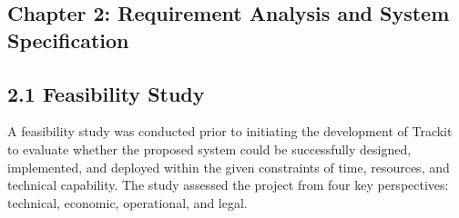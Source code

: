 \documentclass[12pt, oneside]{article}
\begin{document}
\clearpage
\begin{center}
    \section*{Chapter 2: Requirement Analysis and System Specification}
\end{center}

\subsection*{2.1 Feasibility Study}

A feasibility study was conducted prior to initiating the development of Trackit to evaluate whether the proposed system could be successfully designed, implemented, and deployed within the given constraints of time, resources, and technical capability. The study assessed the project from four key perspectives: technical, economic, operational, and legal.
\end{document}
